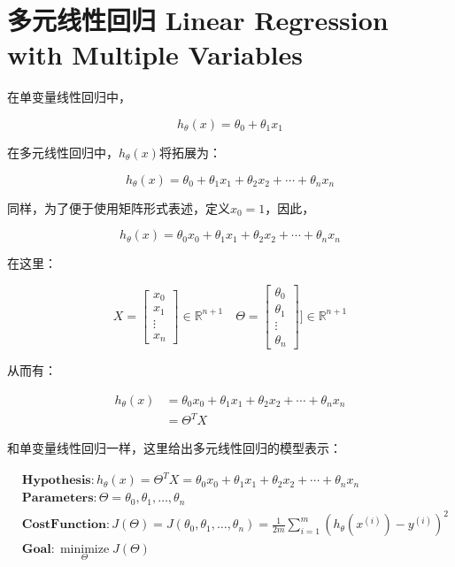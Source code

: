 \documentclass[12pt, a4paper]{article}
\begin{document}
\section{多元线性回归 Linear Regression with Multiple Variables}

在单变量线性回归中，

\begin{equation*}
    h_\theta(x) = \theta_0 + \theta_1x_1
\end{equation*}

在多元线性回归中，$h_\theta(x)$将拓展为：

\begin{equation*}
    h_\theta(x)=\theta_0 + \theta_1x_1+ \theta_2x_2+\cdots+\theta_nx_n
\end{equation*}

同样，为了便于使用矩阵形式表述，定义$x_0=1$，因此，

\begin{equation*}
    h_\theta(x)=\theta_0x_0 + \theta_1x_1+ \theta_2x_2+\cdots+\theta_nx_n
\end{equation*}

在这里：

\begin{equation*}
    X=
    \begin{bmatrix}
        x_0    \\
        x_1    \\
        \vdots \\
        x_n
    \end{bmatrix}
    \in\mathbb{R}^{n+1}\quad
    \Theta=
    \begin{bmatrix}
        \theta_0 \\
        \theta_1 \\
        \vdots   \\
        \theta_n
    \end{bmatrix}
    ]\in\mathbb{R}^{n+1}
\end{equation*}

从而有：

\begin{align*}
    h_\theta(x) & =\theta_0x_0 + \theta_1x_1+ \theta_2x_2+\cdots+\theta_nx_n \\
                & =\Theta^TX
\end{align*}

和单变量线性回归一样，这里给出多元线性回归的模型表示：

\begin{align*}
     & \mathbf{Hypothesis}: h_\theta(x)=\Theta^TX=\theta_0x_0 + \theta_1x_1 + \theta_2x_2+\cdots+\theta_nx_n                          \\
     & \mathbf{Parameters}:\Theta=\theta_0,\theta_1,\dots,\theta_n                                                                    \\
     & \mathbf{Cost Function}:J(\Theta)=J(\theta_0,\theta_1,\dots,\theta_n) = \frac{1}{2m}\sum_{i=1}^{m}(h_\theta(x^{(i)})-y^{(i)})^2 \\
     & \mathbf{Goal}: \mathop{minimize}\limits_{\Theta}J(\Theta)
\end{align*}
\end{document}
